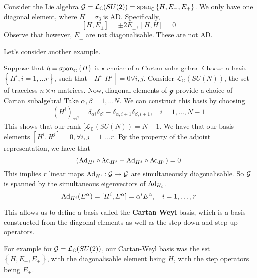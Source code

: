 \begin{example}
	Consider the Lie algebra $\mathcal{ G }  = \mathcal{ L }_{ \mathbb{ C} } ( SU ( 2) )  = 
	\text{span}_{ \mathbb{ C} } \left\{  H , E_ - , E _ +  \right\} $. 
	We only have one diagonal element, where $ H  = \sigma _ 3 $  is AD. 
	Specifically, \[
		[ H , E_{ \pm } ] = \pm 2 E_{\pm}, [ H , H ] = 0 
	\] Observe that however, $ E_{ \pm } $ are not diagonalisable. 
	These are not AD. 
\end{example}
Let's consider another example. 
\begin{example}
	Suppose that $h  = \text{span}_{ \mathbb{ C} } \left\{  H  \right\} $ 
	is a choice of a Cartan subalgebra. 
	Choose a basis $\left\{  H ^ i, i =  1, \dots r  \right\} $, 
	such that $ [ H ^ i , H ^ j ] = 0 \forall i , j $. 
	Consider  $ \mathcal{L}_{ \mathbb{ C} } ( SU ( N ) )$, the set 
	of traceless $ n \times n $ matrices. 
	Now, diagonal elements of $ \mathcal{ g } $ provide a choice 
	of Cartan subalgebra! Take $ \alpha, \beta  = 1 , \dots N$. 
	We can construct this basis by choosing 
	 \[
	 \left(  H ^ i  \right)_{ \alpha \beta }  = 
	 \delta _{ \alpha i } \delta _{ \beta i }  - \delta _{ \alpha , i + 1 } \delta _{ \beta , 
	 i + 1 }, \quad i  = 1 , \dots , N - 1
 \] This shows that our rank $[\mathcal{ L }_{ \mathbb{ C} } ( SU ( N ) )  = N -1$. 
 We have that our basis elements $ [ H ^ i , H ^ j ] = 0, \forall i , j  = 1 , \dots r $. 
 By the property of the adjoint representation, we have that 
 \[
  \left(  \text{Ad}_{H ^ i } \circ \text{Ad}_{ H ^ j }  - \text{Ad}_{ H ^ j } \circ \text{Ad}_{ H ^ i }  \right) = 0  
 \] This implies $ r $ linear maps $\text{Ad}_{ H ^ i } : \mathcal{ G } \to \mathcal{ G } $ are simultaneously 
 diagonalisable. So $ \mathcal{ G } $ is spanned by the simultaneous eigenvectors of $ \text{Ad}_{ H _ i }$.
 \[
	 \text{Ad}_{ H ^ i } ( E ^{ \alpha } ) = [ H ^ i , E ^ \alpha ] = \alpha ^ i E ^ \alpha , 
	 \quad i = 1 , \dots,  r 
 \] 
\end{example}

This allows us to define a basis 
called the \textbf{Cartan Weyl} basis, which 
is a basis constructed from the diagonal elements as 
well as the step down and step up operators. 

For example for $ \mathcal{ G }  = \mathcal{ L } _ \mathbb{ C}  ( SU ( 2) ) $, 
our Cartan-Weyl basis was the set $\left\{  H , E_ - , E _ +  \right\} $, 
with the diagonalisable element being $ H $, with the step operators 
being $ E _{ \pm } $. 

